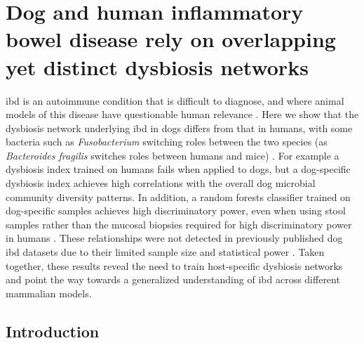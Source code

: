 \glsresetall

\section{Dog and human inflammatory bowel disease rely on overlapping yet distinct dysbiosis networks}\label{dogs}

\Gls{ibd} is an autoimmune condition that is difficult to diagnose, and where animal models of this disease have questionable human relevance \cite{RN17324}. Here we show that the dysbiosis network underlying \gls{ibd} in dogs differs from that in humans, with some bacteria such as \textit{Fusobacterium} switching roles between the two species (as \textit{Bacteroides fragilis} switches roles between humans and mice) \cite{RN154}. For example a dysbiosis index trained on humans fails when applied to dogs, but a dog-specific dysbiosis index achieves high correlations with the overall dog microbial community diversity patterns. In addition, a random forests classifier trained on dog-specific samples achieves high discriminatory power, even when using stool samples rather than the mucosal biopsies required for high discriminatory power in humans \cite{RN154}. These relationships were not detected in previously published dog \gls{ibd} datasets due to their limited sample size and statistical power \cite{RN147}. Taken together, these results reveal the need to train host-specific dysbiosis networks and point the way towards a generalized understanding of \gls{ibd} across different mammalian models.

\subsection{Introduction}

